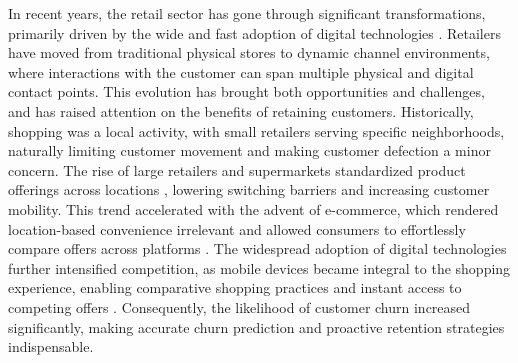 \documentclass[preprint,12pt]{elsarticle}
\begin{document}


In recent years, the retail sector has gone through significant transformations, primarily driven by the wide and fast adoption of digital technologies \cite{REINARTZ2019350}. Retailers have moved from traditional physical stores to dynamic channel environments, where interactions with the customer can span multiple physical and digital contact points. This evolution has brought both opportunities and challenges, and has raised attention on the benefits of retaining customers. 
Historically, shopping was a local activity, with small retailers serving specific neighborhoods, naturally limiting customer movement and making customer defection a minor concern. The rise of large retailers and supermarkets standardized product offerings across locations \cite{basker2012supersize, Reinartz2003TheIO}, lowering switching barriers and increasing customer mobility. This trend accelerated with the advent of e-commerce, which rendered location-based convenience irrelevant and allowed consumers to effortlessly compare offers across platforms \cite{matuszelanski2022customer}. The widespread adoption of digital technologies further intensified competition, as mobile devices became integral to the shopping experience, enabling comparative shopping practices and instant access to competing offers \cite{Digitalization-of-retailing-Hagberg}. Consequently, the likelihood of customer churn increased significantly, making accurate churn prediction and proactive retention strategies indispensable.
\end{document}
